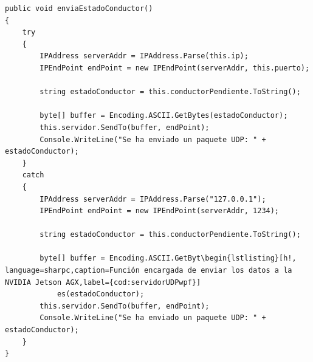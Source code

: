\begin{lstlisting}[float, language=sharpc,caption=Función encargada de enviar los datos a la NVIDIA Jetson AGX,label={cod:servidorUDPwpf}]
public void enviaEstadoConductor()
{
    try
    {
        IPAddress serverAddr = IPAddress.Parse(this.ip);
        IPEndPoint endPoint = new IPEndPoint(serverAddr, this.puerto);

        string estadoConductor = this.conductorPendiente.ToString();

        byte[] buffer = Encoding.ASCII.GetBytes(estadoConductor);
        this.servidor.SendTo(buffer, endPoint);
        Console.WriteLine("Se ha enviado un paquete UDP: " + estadoConductor);
    }
    catch
    {
        IPAddress serverAddr = IPAddress.Parse("127.0.0.1");
        IPEndPoint endPoint = new IPEndPoint(serverAddr, 1234);

        string estadoConductor = this.conductorPendiente.ToString();

        byte[] buffer = Encoding.ASCII.GetByt\begin{lstlisting}[h!, language=sharpc,caption=Función encargada de enviar los datos a la NVIDIA Jetson AGX,label={cod:servidorUDPwpf}]
            es(estadoConductor);
        this.servidor.SendTo(buffer, endPoint);
        Console.WriteLine("Se ha enviado un paquete UDP: " + estadoConductor);
    }
}
\end{lstlisting}




